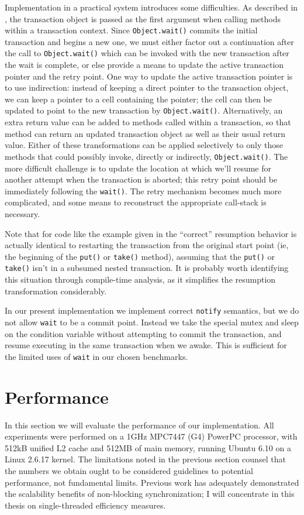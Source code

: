 Implementation in a practical system introduces some difficulties.  As
described in , the transaction object is passed as
the first argument when calling methods within a transaction context.
Since \texttt{Object.wait()} commits the initial transaction and
begins a new one, we must either factor out a continuation after the
call to \texttt{Object.wait()} which can be invoked with the new
transaction after the wait is complete, or else provide a means to
update the active transaction pointer and the retry point.  One way to
update the active transaction pointer is to use indirection: instead
of keeping a direct pointer to the transaction object, we can keep a
pointer to a cell containing the pointer; the cell can then be updated
to point to the new transaction by \texttt{Object.wait()}.
Alternatively, an extra return value can be added to methods called
within a transaction, so that method can return an updated transaction
object as well as their usual return value.  Either of these
transformations can be applied selectively to only those methods that
could possibly invoke, directly or indirectly, \texttt{Object.wait()}.
The more difficult challenge is to update the location at which we'll
resume for another attempt when the transaction is aborted; this retry
point should be immediately following the
\texttt{wait()}. The retry mechanism
becomes much more complicated, and some means to reconstruct the
appropriate call-stack is necessary.

Note that for code like the example given in  the
``correct'' resumption behavior is actually identical to restarting
the transaction from the original start point (ie, the beginning of
the \texttt{put()} or \texttt{take()} method), assuming that the
\texttt{put()} or \texttt{take()} isn't in a subsumed nested
transaction.  It is probably worth identifying this situation through
compile-time analysis, as it simplifies the resumption transformation
considerably.

In our present implementation we implement correct \texttt{notify} semantics,
but we do not allow \texttt{wait} to be a commit point.  Instead we
take the special mutex and sleep on the condition variable without
attempting to commit the transaction, and resume executing in the same
transaction when we awake.  This is sufficient for the limited uses of
\texttt{wait} in our chosen benchmarks.

\section{Performance}\label{sec:full-bench}
In this section we will evaluate the performance of our implementation.
All experiments were performed on a 1GHz MPC7447 (G4) PowerPC processor,
with 512kB unified L2 cache and 512MB of main memory, running Ubuntu
6.10 on a Linux 2.6.17 kernel.  The limitations noted in the previous
section counsel that the numbers we obtain ought to be considered
guidelines to potential performance, not fundamental limits.
Previous work has adequately demonstrated the scalability
benefits of non-blocking synchronization; I will concentrate in this
thesis on single-threaded efficiency measures.

